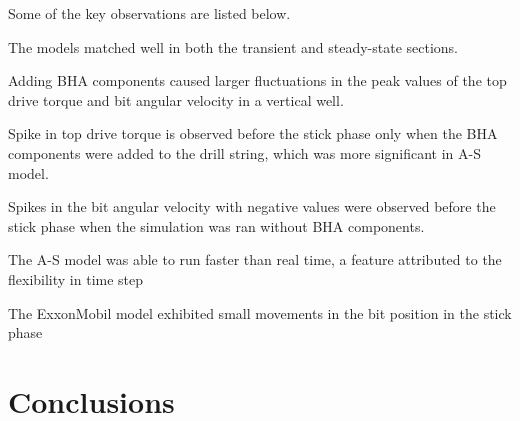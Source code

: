 Some of the key observations are listed below.
\begin{bulletedlist}
    \item The models matched well in both the transient and steady-state sections.
    \item Adding BHA components caused larger fluctuations in the peak values of the top drive torque and bit angular velocity in a vertical well.
    \item Spike in top drive torque is observed before the stick phase only when the BHA components were added to the drill string, which was more significant in A-S model. 
    \item Spikes in the bit angular velocity with negative values were observed before the stick phase when the simulation was ran without BHA components. 
    \item The A-S model was able to run faster than real time, a feature attributed to the flexibility in time step
    \item The ExxonMobil model exhibited small movements in the bit position in the stick phase
\end{bulletedlist}

\section{Conclusions}

